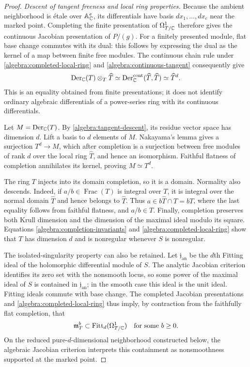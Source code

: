 \begin{proof}
\emph{Descent of tangent freeness and local ring properties.}
Because the ambient neighborhood is \'etale over $\mathbb A^e_{\mathbb C}$,
its differentials have basis $dx_1,\ldots,dx_e$ near the marked point.
Completing the finite presentation of $\Omega^1_{T/\mathbb C}$ therefore
gives the continuous Jacobian presentation of $P/(g)$.  For a finitely
presented module, flat base change commutes with its dual: this follows
by expressing the dual as the kernel of a map between finite free
modules.  The continuous chain rule under
\eqref{algebra:completed-local-ring} and
\eqref{algebra:continuous-tangent} consequently give
\begin{equation}
\label{algebra:tangent-descent}
 \operatorname{Der}_{\mathbb C}(T)\otimes_T\widehat T
 \simeq\operatorname{Der}^{\mathrm{cont}}_{\mathbb C}(\widehat T,\widehat T)
 \simeq\widehat T^{d}.
\end{equation}
This is an equality obtained from finite presentations; it does not
identify ordinary algebraic differentials of a power-series ring with
its continuous differentials.

Let $M=\operatorname{Der}_{\mathbb C}(T)$.  By \eqref{algebra:tangent-descent}, its residue
vector space has dimension $d$.  Lift a basis to $d$ elements of $M$.
Nakayama's lemma gives a surjection $T^d\to M$, which after completion
is a surjection between free modules of rank $d$ over the local ring
$\widehat T$, and hence an isomorphism.  Faithful flatness of completion
annihilates its kernel, proving $M\simeq T^d$.

The ring $T$ injects into its domain completion, so it is a domain.
Normality also descends.  Indeed, if $a/b\in\operatorname{Frac}(T)$
is integral over $T$, it is integral over the normal domain
$\widehat T$ and hence belongs to $\widehat T$.  Thus
$a\in b\widehat T\cap T=bT$, where the last equality follows from
faithful flatness, and $a/b\in T$.  Finally, completion preserves both
Krull dimension and the dimension of the maximal ideal modulo its
square.  Equations \eqref{algebra:completion-invariants} and
\eqref{algebra:completed-local-ring} show that $T$ has dimension $d$
and is nonregular whenever $S$ is nonregular.

The isolated-singularity property can also be retained.  Let
$\mathfrak j_{\mathrm{an}}$ be the $d$th Fitting ideal of the
holomorphic differential module of $S$.  The analytic Jacobian
criterion identifies its zero set with the nonsmooth locus, so some
power of the maximal ideal of $S$ is contained in
$\mathfrak j_{\mathrm{an}}$; in the smooth case this ideal is the unit
ideal.  Fitting ideals commute with base change.  The completed
Jacobian presentations and \eqref{algebra:completed-local-ring} thus
imply, by contraction from the faithfully flat completion, that
\begin{equation}
\label{algebra:isolated-descent}
 \mathfrak m_T^b\subset
 \operatorname{Fitt}_d(\Omega^1_{T/\mathbb C})
 \quad\text{for some }b\ge0.
\end{equation}
On the reduced pure-$d$-dimensional neighborhood constructed below,
the algebraic Jacobian criterion interprets this containment as
nonsmoothness supported at the marked point.


\end{proof}
